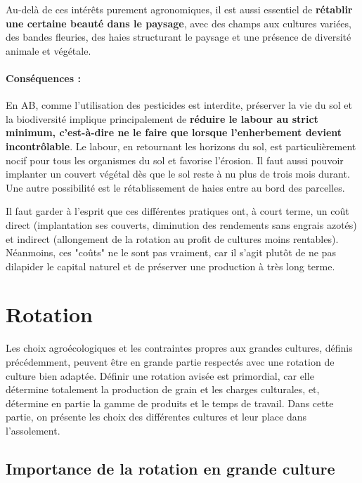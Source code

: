 \documentclass{book}
\begin{document}
Au-delà de ces intérêts purement agronomiques, il est aussi essentiel de \textbf{rétablir une certaine beauté dans le paysage}, avec des champs aux cultures variées, des bandes fleuries, des haies structurant le paysage et une présence de diversité animale et végétale.

\paragraph{Conséquences :} En AB, comme l'utilisation des pesticides est interdite, préserver la vie du sol et la biodiversité implique principalement de \textbf{réduire le labour au strict minimum, c'est-à-dire ne le faire que lorsque l'enherbement devient incontrôlable}. Le labour, en retournant les horizons du sol, est particulièrement nocif pour tous les organismes du sol et favorise l'érosion. Il faut aussi pouvoir implanter un couvert végétal dès que le sol reste à nu plus de trois mois durant. Une autre possibilité est le rétablissement de haies entre au bord des parcelles. 

Il faut garder à l'esprit que ces différentes pratiques ont, à court terme, un coût direct (implantation ses couverts, diminution des rendements sans engrais azotés) et indirect (allongement de la rotation au profit de cultures moins rentables). Néanmoins, ces "coûts" ne le sont pas vraiment, car il s'agit plutôt de ne pas dilapider le capital naturel et de préserver une production à très long terme.


\section{Rotation}

Les choix agroécologiques et les contraintes propres aux grandes cultures, définis précédemment, peuvent être en grande partie respectés avec une rotation de culture bien adaptée. Définir une rotation avisée est primordial, car elle détermine totalement la production de grain et les charges culturales, et, détermine en partie la gamme de produits et le temps de travail. Dans cette partie, on présente les choix des différentes cultures et leur place dans l'assolement.

\subsection{Importance de la rotation en grande culture}
\end{document}
